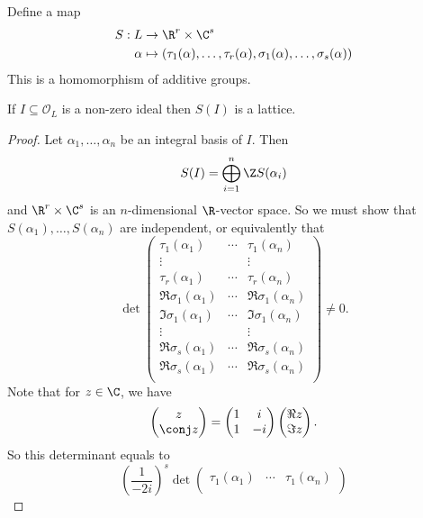 \documentclass[a4paper]{article}
\renewcommand*{\O}{\mathcal{O}}
\begin{document}
Define a map
\begin{align*}
  S: L &\to \R^r \times \C^s \\
  \alpha &\mapsto (\tau_1(\alpha), \dots, \tau_r(\alpha), \sigma_1(\alpha), \dots, \sigma_s(\alpha))
\end{align*}
This is a homomorphism of additive groups.

\begin{lemma}
  If \(I \subseteq \O_L\) is a non-zero ideal then \(S(I)\) is a lattice.
\end{lemma}

\begin{proof}
  Let \(\alpha_1, \dots,\alpha_n\) be an integral basis of \(I\). Then
  \[
    S(I) = \bigoplus_{i = 1}^n \Z S(\alpha_i)
  \]
  and \(\R^r \times \C^s\) is an \(n\)-dimensional \(\R\)-vector space. So we must show that \(S(\alpha_1), \dots, S(\alpha_n)\) are independent, or equivalently that
  \[
    \det
    \begin{pmatrix}
      \tau_1(\alpha_1) & \cdots & \tau_1(\alpha_n) \\
      \vdots & & \vdots \\
      \tau_r(\alpha_1) & \cdots & \tau_r(\alpha_n) \\
      \Re \sigma_1(\alpha_1) & \cdots & \Re \sigma_1(\alpha_n) \\
      \Im \sigma_1(\alpha_1) & \cdots & \Im \sigma_1(\alpha_n) \\
      \vdots & & \vdots \\
      \Re \sigma_s(\alpha_1) & \cdots & \Re \sigma_s(\alpha_n) \\
      \Re \sigma_s(\alpha_1) & \cdots & \Re \sigma_s(\alpha_n) \\
    \end{pmatrix}
    \neq 0.
  \]
  Note that for \(z \in \C\), we have
  \[
    \begin{pmatrix}
      z \\
      \conj z
    \end{pmatrix}
    =
    \begin{pmatrix}
      1 & i \\
      1 & -i
    \end{pmatrix}
    \begin{pmatrix}
      \Re z \\
      \Im z
    \end{pmatrix}
    .
  \]
  So this determinant equals to
  \[
    \left( \frac{1}{-2i} \right)^s \det
    \begin{pmatrix}
      \tau_1(\alpha_1) & \cdots & \tau_1(\alpha_n) \\

\end{pmatrix}\]
\end{proof}
\end{document}

